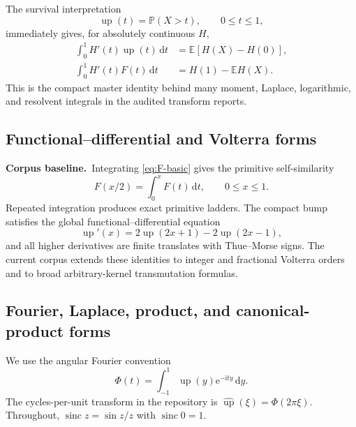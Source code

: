 \documentclass[11pt,oneside]{article}
\theoremstyle{definition}
\theoremstyle{remark}
\newcommand{\E}{\mathbb E}
\newcommand{\Prob}{\mathbb P}
\newcommand{\Up}{\operatorname{up}}
\newcommand{\sinc}{\operatorname{sinc}}
\newcommand{\dd}{\,\mathrm d}
\newcommand{\ii}{\mathrm i}
\newcommand{\e}{\mathrm e}
\newcommand{\1}{\mathbf 1}
\newcommand{\baseline}{\textcolor{linkblue}{\textbf{Corpus baseline.}}\ }
\begin{document}
The survival interpretation
\begin{equation}
 \Up(t)=\Prob(X>t),\qquad 0\le t\le1,                    \label{eq:survival-probability}
\end{equation}
immediately gives, for absolutely continuous $H$,
\begin{align}
 \int_0^1H'(t)\Up(t)\dd t
   &=\E[H(X)-H(0)],                                      \label{eq:master-survival}\\
 \int_0^1H'(t)F(t)\dd t
   &=H(1)-\E H(X).                                       \label{eq:master-cdf}
\end{align}
This is the compact master identity behind many moment, Laplace, logarithmic,
and resolvent integrals in the audited transform reports.

\subsection{Functional--differential and Volterra forms}

\baseline Integrating \eqref{eq:F-basic} gives the primitive self-similarity
\begin{equation}
 F(x/2)=\int_0^xF(t)\dd t,
 \qquad 0\le x\le1.                                     \label{eq:volterra-basic}
\end{equation}
Repeated integration produces exact primitive ladders.  The compact bump
satisfies the global functional--differential equation
\begin{equation}
 \Up'(x)=2\Up(2x+1)-2\Up(2x-1),                         \label{eq:up-differential}
\end{equation}
and all higher derivatives are finite translates with Thue--Morse signs.
The current corpus extends these identities to integer and fractional
Volterra orders and to broad arbitrary-kernel transmutation formulas.

\subsection{Fourier, Laplace, product, and canonical-product forms}

We use the angular Fourier convention
\begin{equation}
 \Phi(t)=\int_{-1}^{1}\Up(y)\e^{-\ii ty}\dd y.           \label{eq:Phi-definition}
\end{equation}
The cycles-per-unit transform in the repository is
$\widehat{\Up}(\xi)=\Phi(2\pi\xi)$.  Throughout,
$\sinc z=\sin z/z$ with $\sinc0=1$.
\end{document}
